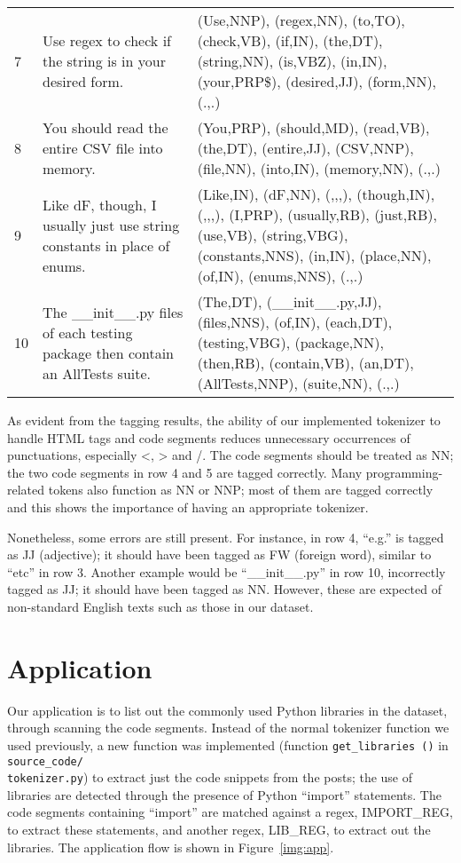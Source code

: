 \begin{table}[htp]
\begin{tabu}{X[0.2,l]X[1,l]X[2,l]}
    7 &
    Use regex to check if the string is in your desired form. &
    (Use,NNP), (regex,NN), (to,TO), (check,VB), (if,IN), (the,DT),
    (string,NN), (is,VBZ), (in,IN), (your,PRP\$), (desired,JJ), (form,NN),
    (.,.) \\
    8 & 
    You should read the entire CSV file into memory. &
    (You,PRP), (should,MD), (read,VB), (the,DT), (entire,JJ), (CSV,NNP),
    (file,NN), (into,IN), (memory,NN), (.,.) \\
    9 & 
    Like dF, though, I usually just use string constants in place of enums. &
    (Like,IN), (dF,NN), (,,,), (though,IN), (,,,), (I,PRP), (usually,RB),
    (just,RB), (use,VB), (string,VBG), (constants,NNS), (in,IN), (place,NN),
    (of,IN), (enums,NNS), (.,.) \\
    10 & 
    The \_\_init\_\_.py files of each testing package then contain an AllTests
    suite. &
    (The,DT), (\_\_init\_\_.py,JJ), (files,NNS), (of,IN), (each,DT),
    (testing,VBG), (package,NN), (then,RB), (contain,VB), (an,DT),
    (AllTests,NNP), (suite,NN), (.,.) \\
\end{tabu}
\end{table}

As evident from the tagging results, the ability of our implemented tokenizer
to handle HTML tags and code segments reduces unnecessary occurrences of
punctuations, especially <, > and /. The code segments should be treated as
NN; the two code segments in row 4 and 5 are tagged correctly. Many
programming-related tokens also function as NN or NNP; most of them are tagged
correctly and this shows the importance of having an appropriate tokenizer.

Nonetheless, some errors are still present. For instance, in row 4, ``e.g.''
is tagged as JJ (adjective); it should have been tagged as FW (foreign word),
similar to ``etc'' in row 3. Another example would be ``\_\_init\_\_.py'' in
row 10, incorrectly tagged as JJ; it should have been tagged as NN. However,
these are expected of non-standard English texts such as those in our dataset.

\section{Application}

Our application is to list out the commonly used Python libraries in the
dataset, through scanning the code segments. Instead of the normal tokenizer
function we used previously, a new function was implemented (function
\texttt{get\_libraries\,()} in \texttt{source\_code/\\tokenizer.py}) to extract
just the code snippets from the posts; the use of libraries are
detected through the presence of Python ``import'' statements. The code
segments containing ``import'' are matched against a regex, IMPORT\_REG, to
extract these statements, and another regex, LIB\_REG, to extract out the
libraries. The application flow is shown in Figure~\ref{img:app}.

